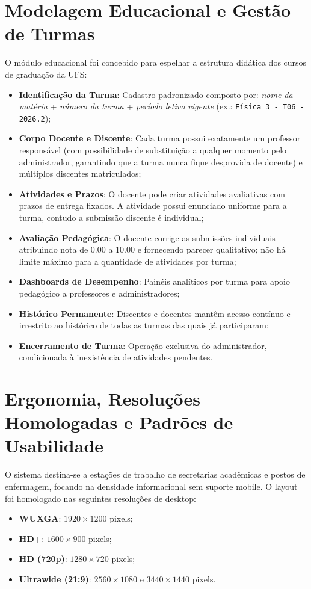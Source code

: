 \section{Modelagem Educacional e Gestão de Turmas}
\label{sec:modelagem-turmas}

O módulo educacional foi concebido para espelhar a estrutura didática dos cursos de graduação da UFS:
\begin{itemize}
    \item \textbf{Identificação da Turma}: Cadastro padronizado composto por: \textit{nome da matéria} + \textit{número da turma} + \textit{período letivo vigente} (ex.: \texttt{Física 3 - T06 - 2026.2});
    \item \textbf{Corpo Docente e Discente}: Cada turma possui exatamente um professor responsável (com possibilidade de substituição a qualquer momento pelo administrador, garantindo que a turma nunca fique desprovida de docente) e múltiplos discentes matriculados;
    \item \textbf{Atividades e Prazos}: O docente pode criar atividades avaliativas com prazos de entrega fixados. A atividade possui enunciado uniforme para a turma, contudo a submissão discente é individual;
    \item \textbf{Avaliação Pedagógica}: O docente corrige as submissões individuais atribuindo nota de 0.00 a 10.00 e fornecendo parecer qualitativo; não há limite máximo para a quantidade de atividades por turma;
    \item \textbf{Dashboards de Desempenho}: Painéis analíticos por turma para apoio pedagógico a professores e administradores;
    \item \textbf{Histórico Permanente}: Discentes e docentes mantêm acesso contínuo e irrestrito ao histórico de todas as turmas das quais já participaram;
    \item \textbf{Encerramento de Turma}: Operação exclusiva do administrador, condicionada à inexistência de atividades pendentes.
\end{itemize}

\section{Ergonomia, Resoluções Homologadas e Padrões de Usabilidade}
\label{sec:ergonomia-telas}

O sistema destina-se a estações de trabalho de secretarias acadêmicas e postos de enfermagem, focando na densidade informacional sem suporte mobile. O layout foi homologado nas seguintes resoluções de desktop:
\begin{itemize}
    \item \textbf{WUXGA}: $1920 \times 1200$ pixels;
    \item \textbf{HD+}: $1600 \times 900$ pixels;
    \item \textbf{HD (720p)}: $1280 \times 720$ pixels;
    \item \textbf{Ultrawide (21:9)}: $2560 \times 1080$ e $3440 \times 1440$ pixels.
\end{itemize}

